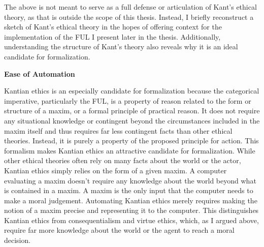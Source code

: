 \begin{isabellebody}
\begin{isamarkuptext}
The above is not meant to serve as a full defense or articulation of Kant's ethical theory, as that is outside the scope
of this thesis. Instead, I briefly reconstruct a sketch of Kant's ethical theory in the hopes 
of offering context for the implementation of the FUL I present later in the thesis. Additionally, understanding 
the structure of Kant's theory also reveals why it is an ideal candidate 
for formalization.%
\end{isamarkuptext}\isamarkuptrue%
%
\begin{isamarkuptext}%
\textbf{Ease of Automation}%
\end{isamarkuptext}\isamarkuptrue%
%
\begin{isamarkuptext}%
Kantian ethics is an especially candidate for formalization because the categorical imperative, particularly the FUL, 
is a property of reason related to the form or structure of a maxim, or a formal principle of practical
reason. It does not require any situational knowledge or contingent beyond the circumstances included
in the maxim itself and thus requires far less contingent facts than other ethical theories.
Instead, 
it is purely a property of the proposed principle for action. This formalism makes Kantian ethics an 
attractive candidate for formalization. While other ethical theories often rely on many facts about 
the world or the actor, Kantian ethics simply relies on the form of a given maxim. A computer evaluating 
a maxim doesn't require any knowledge about the world beyond what is contained in a maxim. A maxim 
is the only input that the computer needs to make a moral judgement. Automating 
Kantian ethics merely requires making the notion of a maxim precise and representing it to the computer. 
This distinguishes Kantian ethics from consequentialism and virtue ethics, which, as I argued above, 
require far more knowledge about the world or the agent to reach a moral decision.


\end{isamarkuptext}
\end{isabellebody}
